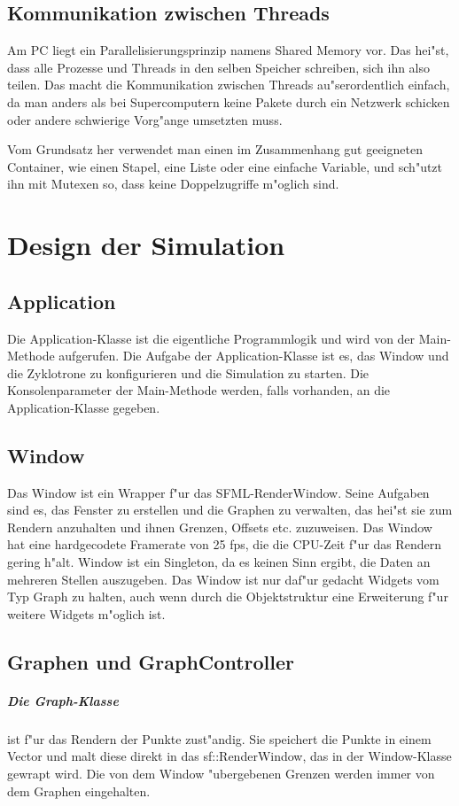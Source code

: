 \documentclass[14pt, a4paper]{report}
\begin{document}
\section{Kommunikation zwischen Threads}
Am PC liegt ein Parallelisierungsprinzip namens Shared Memory vor. Das hei"st, dass 
alle Prozesse und Threads in den selben Speicher schreiben, sich ihn also teilen. 
Das macht die Kommunikation zwischen Threads au"serordentlich einfach, da man anders als
bei Supercomputern keine Pakete durch ein Netzwerk schicken oder andere schwierige 
Vorg"ange umsetzten muss. 

Vom Grundsatz her verwendet man einen im Zusammenhang gut geeigneten Container, wie
einen Stapel, eine Liste oder eine einfache Variable, und sch"utzt ihn mit Mutexen so, dass 
keine Doppelzugriffe m"oglich sind.

\chapter{Design der Simulation}
\section{Application}
Die Application-Klasse ist die eigentliche Programmlogik und wird von der Main-Methode
aufgerufen. Die Aufgabe der Application-Klasse ist es, das Window und die Zyklotrone
zu konfigurieren und die Simulation zu starten. Die Konsolenparameter der Main-Methode
werden, falls vorhanden, an die Application-Klasse gegeben.

\section{Window} 
Das Window ist ein Wrapper f"ur das SFML-RenderWindow. Seine Aufgaben sind es, das 
Fenster zu erstellen und die Graphen zu verwalten, das hei"st sie zum Rendern 
anzuhalten und ihnen Grenzen, Offsets etc. zuzuweisen. Das Window hat eine 
hardgecodete Framerate von 25 fps, die die CPU-Zeit f"ur das Rendern gering h"alt.
Window ist ein Singleton, da es keinen Sinn ergibt, die Daten an mehreren Stellen 
auszugeben. Das Window ist nur daf"ur gedacht Widgets vom Typ Graph zu halten,
auch wenn durch die Objektstruktur eine Erweiterung f"ur weitere Widgets m"oglich ist.

\section{Graphen und GraphController}
\paragraph{Die Graph-Klasse} ist f"ur das Rendern der Punkte zust"andig. Sie speichert
die Punkte in einem Vector und malt diese direkt in das sf::RenderWindow, das in der
Window-Klasse gewrapt wird. Die von dem Window "ubergebenen Grenzen werden immer von dem
Graphen eingehalten.
\end{document}
